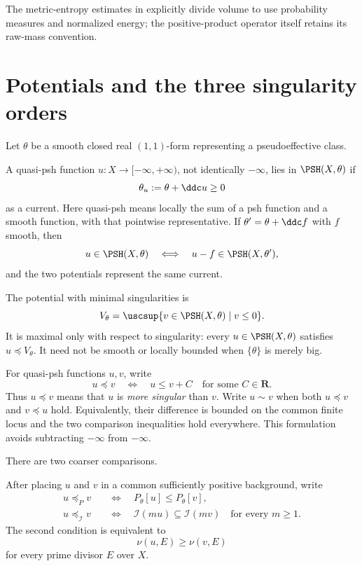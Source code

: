 The metric-entropy estimates in 
explicitly divide volume to use probability measures and normalized energy;
the positive-product operator itself retains its raw-mass convention.

\section{Potentials and the three singularity orders}
\label{sec:appH-singularity-orders}

Let \(\theta\) be a smooth closed real \((1,1)\)-form representing a
pseudoeffective class.

\begin{definition}
\label{def:appH-potentials}
A quasi-psh function \(u:X\to[-\infty,+\infty)\), not identically
\(-\infty\), lies in \(\PSH(X,\theta)\) if
\[
                         \theta_u:=\theta+\ddc u\geq0
\]
as a current. Here quasi-psh means locally the sum of a psh function and
a smooth function, with that pointwise representative. If
\(\theta'=\theta+\ddc f\) with \(f\) smooth, then
\[
       u\in\PSH(X,\theta)
       \quad\Longleftrightarrow\quad
       u-f\in\PSH(X,\theta'),
\]
and the two potentials represent the same current.
\end{definition}

The potential with minimal singularities is
\[
 V_\theta
 =\uscsup\{v\in\PSH(X,\theta)\mid v\leq0\}.
\]
It is maximal only with respect to singularity: every
\(u\in\PSH(X,\theta)\) satisfies \(u\preceq V_\theta\). It need not be
smooth or locally bounded when \(\{\theta\}\) is merely big.

\begin{definition}
\label{def:appH-ordinary-type}
For quasi-psh functions \(u,v\), write
\[
 u\preceq v
 \quad\Longleftrightarrow\quad
 u\leq v+C
 \quad\text{for some }C\in\mathbf R.
\]
Thus \(u\preceq v\) means that \(u\) is \emph{more singular} than \(v\).
Write \(u\sim v\) when both \(u\preceq v\) and \(v\preceq u\) hold.
Equivalently, their difference is bounded on the common finite locus and
the two comparison inequalities hold everywhere.  This formulation avoids
subtracting \(-\infty\) from \(-\infty\).
\end{definition}

There are two coarser comparisons.

\begin{definition}
\label{def:appH-p-i-orders}
After placing \(u\) and \(v\) in a common sufficiently positive background,
write
\[
\begin{aligned}
 u\preceq_Pv
 &\quad\Longleftrightarrow\quad
 P_\theta[u]\leq P_\theta[v],\\
 u\preceq_{\mathcal I}v
 &\quad\Longleftrightarrow\quad
 \mathcal I(m u)\subseteq\mathcal I(m v)
 \quad\text{for every }m\geq1.
\end{aligned}
\]
The second condition is equivalent to
\[
                         \nu(u,E)\geq\nu(v,E)
\]
for every prime divisor \(E\) over \(X\).
\end{definition}

